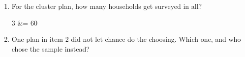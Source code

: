 \documentclass[10pt]{article}
\begin{document}
\begin{tcolorbox}[colback=white, colframe=black!40, breakable,
    title=\textbf{Tier R --- Remediate},
    fonttitle=\bfseries, arc=2mm, left=3mm, right=3mm, top=2mm, bottom=2mm]
\begin{enumerate}[leftmargin=1.6em, itemsep=6pt, topsep=4pt]
        The random start lands on household $4$. Write the next three picks.

         \qquad {} \qquad {}

  \item For the cluster plan, how many households get surveyed in all?

        \begin{work}
          3  &= 60 
        \end{work}

  \item One plan in item 2 did not let chance do the choosing. Which one, and who
        chose the sample instead?
\end{enumerate}
\end{tcolorbox}

\vspace{0.1in}
\end{document}

